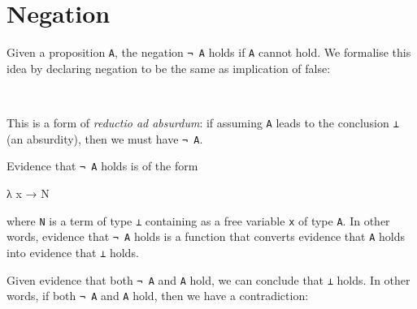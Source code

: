 \hypertarget{negation}{%
\section{Negation}\label{negation}}

Given a proposition \texttt{A}, the negation \texttt{¬\ A} holds if
\texttt{A} cannot hold. We formalise this idea by declaring negation to
be the same as implication of false:

\begin{fence}
\begin{code}%
\>[0]\AgdaSpace{}%
\AgdaSymbol{:}\AgdaSpace{}%
\AgdaSpace{}%
\AgdaSpace{}%
\<%
\\
\>[0]\AgdaSpace{}%
\AgdaSpace{}%
\AgdaSymbol{=}\AgdaSpace{}%
\AgdaSpace{}%
\AgdaSpace{}%
\<%
\end{code}
\end{fence}

This is a form of \emph{reductio ad absurdum}: if assuming \texttt{A}
leads to the conclusion \texttt{⊥} (an absurdity), then we must have
\texttt{¬\ A}.

Evidence that \texttt{¬\ A} holds is of the form

\begin{myDisplay}
λ{ x → N }
\end{myDisplay}

where \texttt{N} is a term of type \texttt{⊥} containing as a free
variable \texttt{x} of type \texttt{A}. In other words, evidence that
\texttt{¬\ A} holds is a function that converts evidence that \texttt{A}
holds into evidence that \texttt{⊥} holds.

Given evidence that both \texttt{¬\ A} and \texttt{A} hold, we can
conclude that \texttt{⊥} holds. In other words, if both \texttt{¬\ A}
and \texttt{A} hold, then we have a contradiction:

\begin{fence}
\begin{code}%
\>[0]\AgdaSpace{}%
\AgdaSymbol{:}\AgdaSpace{}%
\AgdaSpace{}%
\AgdaSymbol{\{}\AgdaSpace{}%
\AgdaSymbol{:}\AgdaSpace{}%
\AgdaSymbol{\}}\<%
\\
\>[0][@{}l@{\AgdaIndent{0}}]%
\>[2]\AgdaSpace{}%
\AgdaSpace{}%
\<%
\\
%
\>[2]%
\>[49I]\<%
\\
\>[.][@{}l@{}]\<[49I]%
\>[4]\AgdaComment{---}\<%
\\
%
\>[2]\AgdaSpace{}%
\<%
\\
\>[0]\AgdaSpace{}%
\AgdaSpace{}%
\AgdaSpace{}%
\AgdaSymbol{=}\AgdaSpace{}%
\AgdaSpace{}%
\<%
\end{code}
\end{fence}

